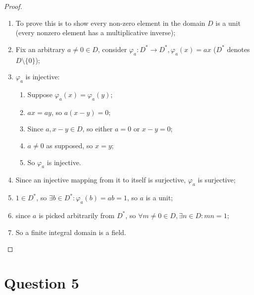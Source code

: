 \documentclass{article}
\begin{document}
\begin{proof}
    ~
    \begin{enumerate}
        \item To prove this is to show every non-zero element in the domain $D$ is a unit (every nonzero element has a multiplicative inverse);
        \item Fix an arbitrary $a \ne 0\in D$, consider $\varphi_a:D^*\to D^*, \varphi_a(x)=ax$ ($D^*$ denotes $D\setminus \{0\}$);
        \item $\varphi_a $ is injective:
        \begin{enumerate}
            \item Suppose $\varphi_a(x)=\varphi_a(y)$;
            \item $ax=ay$, so $a(x-y)=0$;
            \item Since $a,x-y\in D$, so either $a=0$ or $x-y=0$;
            \item $a\ne0$ as supposed, so $x=y$;
            \item So $\varphi_a$ is injective.
        \end{enumerate}
        \item Since an injective mapping from it to itself is surjective, $\varphi_a$ is surjective;
        \item $1\in D^*$, so $\exists b\in D^*:\varphi_a(b)=ab=1$, so $a$ is a unit;
        \item since $a$ is picked arbitrarily from $D^*$, so $\forall m\ne 0\in D, \exists n\in D: mn=1$;
        \item So a finite integral domain is a field.
    \end{enumerate}
\end{proof}

\newpage

\section*{Question 5}
\end{document}
